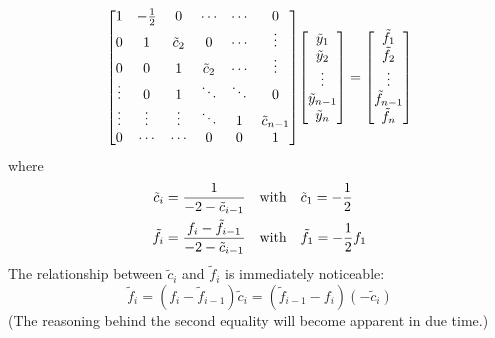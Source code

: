 \documentclass[reprint,english]{revtex4-1}
\begin{document}
\[\mqty[1 & -\frac{1}{2} & 0 & \cdots & \cdots & 0 \\
0 & 1 & \tilde{c}_2 & 0 & \cdots & \vdots \\
0 & 0 & 1 & \tilde{c}_2 & \cdots & \vdots \\
\vdots & 0 & 1 & \ddots & \ddots & 0 \\
\vdots & \vdots & \vdots & \ddots & 1 & \tilde{c}_{n-1} \\
0 & \cdots & \cdots & 0 & 0 & 1]\mqty[\tilde{y}_1 \\ \tilde{y}_2 \\ \vdots \\ \tilde{y}_{n-1} \\ \tilde{y}_n]=\mqty[\tilde{f}_1 \\ \tilde{f}_2 \\ \vdots \\ \tilde{f}_{n-1} \\ \tilde{f}_n]\]
where
\begin{align}
\tilde{c}_i&=\frac{1}{-2-\tilde{c}_{i-1}}\qq{with}\tilde{c}_1=-\frac{1}{2}\\
\tilde{f}_i&=\frac{f_i-\tilde{f}_{i-1}}{-2-\tilde{c}_{i-1}}\qq{with}\tilde{f}_1=-\frac{1}{2}f_1
\end{align}
The relationship between \(\tilde{c}_i\) and \(\tilde{f}_i\) is immediately noticeable:
\begin{equation}\label{eq:f_tilde_recursion_relation}
\tilde{f}_i=(f_i-\tilde{f}_{i-1})\tilde{c}_i=(\tilde{f}_{i-1}-f_i)(-\tilde{c}_i)
\end{equation}
(The reasoning behind the second equality will become apparent in due time.)
\end{document}

